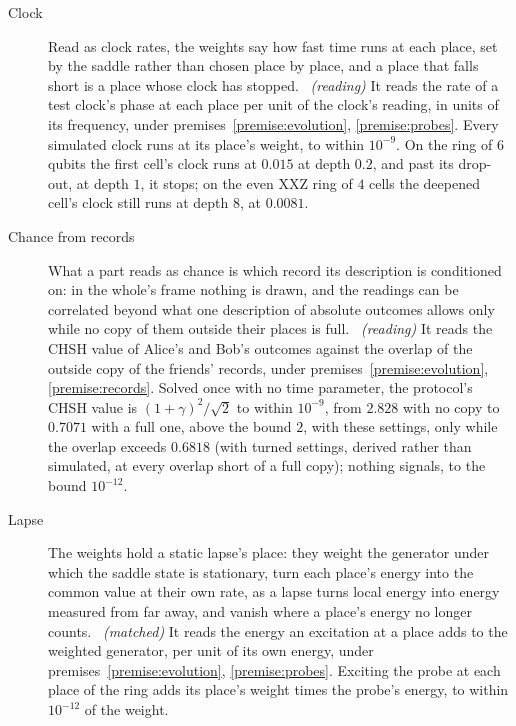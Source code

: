 \begin{description}
  \item[Clock] Read as clock rates, the weights say how fast time runs at each place, set by the saddle rather than chosen place by place, and a place that falls short is a place whose clock has stopped.~\cite{PageWootters1983} \emph{(reading)} It reads the rate of a test clock's phase at each place per unit of the clock's reading, in units of its frequency, under premises~\ref{premise:evolution}, \ref{premise:probes}. Every simulated clock runs at its place's weight, to within $10^{-9}$. On the ring of $6$ qubits the first cell's clock runs at $0.015$ at depth $0.2$, and past its drop-out, at depth $1$, it stops; on the even XXZ ring of $4$ cells the deepened cell's clock still runs at depth $8$, at $0.0081$.
  \item[Chance from records] What a part reads as chance is which record its description is conditioned on: in the whole's frame nothing is drawn, and the readings can be correlated beyond what one description of absolute outcomes allows only while no copy of them outside their places is full.~\cite{BongEtAl2020} \emph{(reading)} It reads the CHSH value of Alice's and Bob's outcomes against the overlap of the outside copy of the friends' records, under premises~\ref{premise:evolution}, \ref{premise:records}. Solved once with no time parameter, the protocol's CHSH value is $(1+\gamma)^2/\sqrt{2}$ to within $10^{-9}$, from $2.828$ with no copy to $0.7071$ with a full one, above the bound $2$, with these settings, only while the overlap exceeds $0.6818$ (with turned settings, derived rather than simulated, at every overlap short of a full copy); nothing signals, to the bound $10^{-12}$.
  \item[Lapse] The weights hold a static lapse's place: they weight the generator under which the saddle state is stationary, turn each place's energy into the common value at their own rate, as a lapse turns local energy into energy measured from far away, and vanish where a place's energy no longer counts.~\cite{Tolman1930} \emph{(matched)} It reads the energy an excitation at a place adds to the weighted generator, per unit of its own energy, under premises~\ref{premise:evolution}, \ref{premise:probes}. Exciting the probe at each place of the ring adds its place's weight times the probe's energy, to within $10^{-12}$ of the weight.

\end{description}
